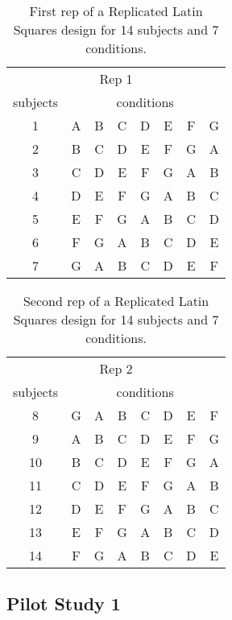 \begin{table}[h] %
\centering
\caption[Latin Squares Design Rep 1]{\centering First rep of a Replicated Latin Squares design for 14 subjects and 7 conditions.}
\label{table_latin_squares_rep_1}
\begin{tabular}{c | c c c c c c c}
    \hline
    \multicolumn{8}{c}{Rep 1} \\
    subjects & \multicolumn{7}{c}{conditions} \\
    \hline
    1 & A & B & C & D & E & F & G \\
    2 & B & C & D & E & F & G & A \\
    3 & C & D & E & F & G & A & B \\
    4 & D & E & F & G & A & B & C \\
    5 & E & F & G & A & B & C & D \\
    6 & F & G & A & B & C & D & E \\
    7 & G & A & B & C & D & E & F \\
    \hline
\end{tabular}
\end{table}

\begin{table}[h] %
\centering
\caption[Latin Squares Design Rep 2]{\centering Second rep of a Replicated Latin Squares design for 14 subjects and 7 conditions.}
\label{table_latin_squares_rep_2}
\begin{tabular}{c | c c c c c c c}
    \hline
    \multicolumn{8}{c}{Rep 2} \\
    subjects & \multicolumn{7}{c}{conditions} \\
    \hline
    8 & G & A & B & C & D & E & F \\
    9 & A & B & C & D & E & F & G \\
    10 & B & C & D & E & F & G & A \\
    11 & C & D & E & F & G & A & B \\
    12 & D & E & F & G & A & B & C \\
    13 & E & F & G & A & B & C & D \\
    14 & F & G & A & B & C & D & E \\
    \hline
\end{tabular}
\end{table}

\subsection{Pilot Study 1}

